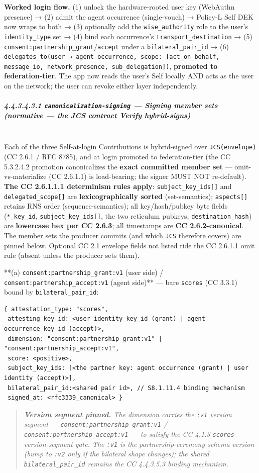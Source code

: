 \documentclass[11pt]{article}
\begin{document}
\textbf{Worked login flow.} (1) unlock the hardware-rooted user key (WebAuthn presence) → (2) admit the agent occurrence (single-vouch) → Policy-L Self DEK now wraps to both → (3) optionally add the \texttt{wise\_authority} role to the user's \texttt{identity\_type} set → (4) bind each occurrence's \texttt{transport\_destination} → (5) \texttt{consent:partnership\_grant}/\texttt{accept} under a \texttt{bilateral\_pair\_id} → (6) \texttt{delegates\_to(user → agent occurrence, scope: [act\_on\_behalf, message\_io, network\_presence, sub\_delegation])}, \textbf{promoted to federation-tier}. The app now reads the user's Self locally AND acts as the user on the network; the user can revoke either layer independently.


\subparagraph{4.4.3.4.3.1 \texttt{canonicalization-signing} — Signing member sets (normative — the JCS contract Verify hybrid-signs)}\mbox{}\\


Each of the three Self-at-login Contributions is hybrid-signed over \texttt{JCS(envelope)} (CC 2.6.1 / RFC 8785), and at login promoted to federation-tier (the CC 5.3.2.4.2 promotion canonicalizes the \textbf{exact committed member set} — omit-vs-materialize (CC 2.6.1.1) is load-bearing; the signer MUST NOT re-default). \textbf{The CC 2.6.1.1.1 determinism rules apply}: \texttt{subject\_key\_ids[]} and \texttt{delegated\_scope[]} are \textbf{lexicographically sorted} (set-semantics); \texttt{aspects[]} retains RNS order (sequence-semantics); all key/hash/pubkey byte fields (\texttt{*\_key\_id}, \texttt{subject\_key\_ids[]}, the two reticulum pubkeys, \texttt{destination\_hash}) are \textbf{lowercase hex per CC 2.6.3}; all timestamps are \textbf{CC 2.6.2-canonical}. The member sets the producer commits (and which \texttt{JCS} therefore covers) are pinned below. Optional CC 2.1 envelope fields not listed ride the CC 2.6.1.1 omit rule (absent unless the producer sets them).


**(a) \texttt{consent:partnership\_grant:v1} (user side) / \texttt{consent:partnership\_accept:v1} (agent side)** — bare \texttt{scores} (CC 3.3.1) bound by \texttt{bilateral\_pair\_id}:

\begin{lstlisting}
{ attestation_type: "scores",
 attesting_key_id: <user identity_key_id (grant) | agent occurrence_key_id (accept)>,
 dimension: "consent:partnership_grant:v1" | "consent:partnership_accept:v1",
 score: <positive>,
 subject_key_ids: [<the partner key: agent occurrence (grant) | user identity (accept)>],
 bilateral_pair_id:<shared pair id>, // S8.1.11.4 binding mechanism
 signed_at: <rfc3339_canonical> }
\end{lstlisting}
\begin{quote}\itshape \textbf{Version segment pinned.} The dimension carries the \texttt{:v1} version segment — \texttt{consent:partnership\_grant:v1} / \texttt{consent:partnership\_accept:v1} — to satisfy the CC 4.1.3 \texttt{scores} version-segment gate. The \texttt{:v1} is the partnership-ceremony schema version (bump to \texttt{:v2} only if the bilateral shape changes); the shared \texttt{bilateral\_pair\_id} remains the CC 4.4.3.5.3 binding mechanism.\end{quote}
\end{document}
